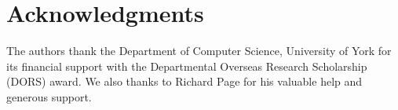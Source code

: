 \documentclass{acm_proc_article-sp}
\begin{document}
\section{Acknowledgments}
The authors thank the Department of Computer Science, University of York for its financial support with the Departmental Overseas Research Scholarship (DORS) award. We also thanks to Richard Page for his valuable help and generous support.




%

%
%
\end{document}
